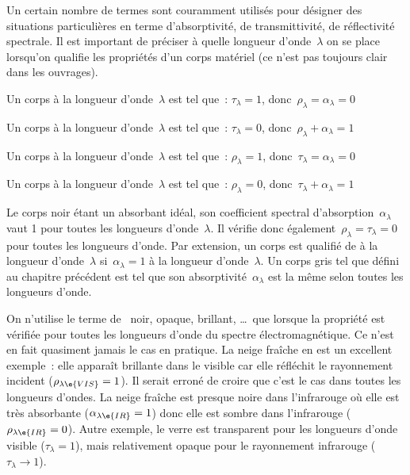 \sk
Un certain nombre de termes sont couramment utilisés pour désigner des situations particulières en terme d'absorptivité, de transmittivité, de réflectivité spectrale. Il est important de préciser à quelle longueur d'onde~$\lambda$ on se place lorsqu'on qualifie les propriétés d'un corps matériel (ce n'est pas toujours clair dans les ouvrages).
\begin{citemize}
\item Un corps  à la longueur d'onde~$\lambda$ est tel que~: $\tau_\lambda = 1$, donc~$\rho_\lambda = \alpha_\lambda = 0$
\item Un corps  à la longueur d'onde~$\lambda$ est tel que~: $\tau_\lambda = 0$, donc~$\rho_\lambda + \alpha_\lambda = 1$
\item Un corps  à la longueur d'onde~$\lambda$ est tel que~: $\rho_\lambda = 1$, donc~$\tau_\lambda = \alpha_\lambda = 0$
\item Un corps  à la longueur d'onde~$\lambda$ est tel que~: $\rho_\lambda = 0$, donc~$\tau_\lambda + \alpha_\lambda = 1$
\end{citemize}
Le corps noir étant un absorbant idéal, son coefficient spectral d'absorption~$\alpha_\lambda$ vaut 1 pour toutes les longueurs d'onde~$\lambda$. Il vérifie donc également~$\rho_\lambda = \tau_\lambda = 0$ pour toutes les longueurs d'onde. Par extension, un corps est qualifié de  à la longueur d'onde~$\lambda$ si~$\alpha_\lambda = 1$ à la longueur d'onde~$\lambda$. Un corps gris tel que défini au chapitre précédent est tel que son absorptivité~$\alpha_\lambda$ est la même selon toutes les longueurs d'onde.

\sk
On n'utilise le terme de~ noir, opaque, brillant, \ldots~que lorsque la propriété est vérifiée pour toutes les longueurs d'onde du spectre électromagnétique. Ce n'est en fait quasiment jamais le cas en pratique. La neige fraîche en est un excellent exemple~: elle apparaît brillante dans le visible car elle réfléchit le rayonnement incident ($\rho_{\lambda\e{VIS}}=1$). Il serait erroné de croire que c'est le cas dans toutes les longueurs d'ondes. La neige fraîche est presque noire dans l'infrarouge où elle est très absorbante ($\alpha_{\lambda\e{IR}}=1$) donc elle est sombre dans l'infrarouge ($\rho_{\lambda\e{IR}}=0$). Autre exemple, le verre est transparent pour les longueurs d'onde visible ($\tau_\lambda = 1$), mais relativement opaque pour le rayonnement infrarouge ($\tau_\lambda \rightarrow 1$).
